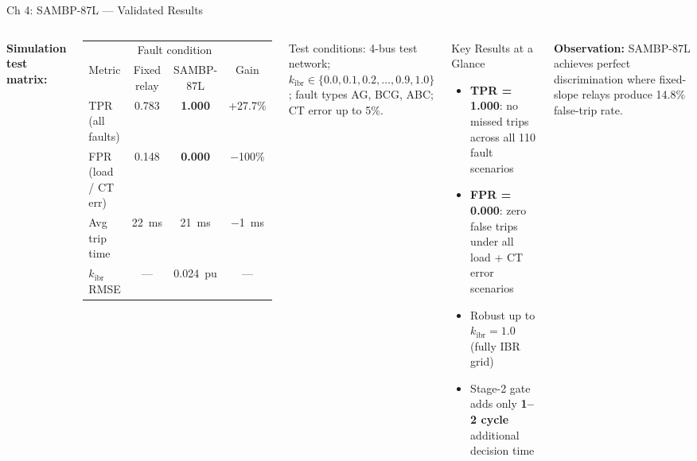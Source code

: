 \documentclass[10pt,aspectratio=169]{beamer}
\newcommand{\obs}[1]{%
  {\color{iitmred}\textbf{Observation:} #1}%
}
\newcommand{\kibr}{k_{\mathrm{ibr}}}
\begin{document}
\begin{frame}{Ch 4: SAMBP-87L — Validated Results}
  \begin{columns}[T]
      \textbf{Simulation test matrix:}
      \begin{center}\small
        \begin{tabular}{lccc}
          \toprule
          & \multicolumn{2}{c}{Fault condition} & \\
          \cmidrule(lr){2-3}
          Metric & Fixed relay & SAMBP-87L & Gain \\
          \midrule
          TPR (all faults) & 0.783 & \textbf{1.000} & +27.7\% \\
          FPR (load / CT err) & 0.148 & \textbf{0.000} & $-$100\% \\
          Avg trip time & 22~ms & 21~ms & $-$1~ms \\
          $\kibr$ RMSE & — & 0.024~pu & — \\
          \bottomrule
        \end{tabular}
      \end{center}
      \vspace{0.2cm}
      \small Test conditions: 4-bus test network;
      $\kibr \in \{0.0, 0.1, 0.2, \ldots, 0.9, 1.0\}$;
      fault types AG, BCG, ABC; CT error up to 5\%.
      \begin{block}{\small Key Results at a Glance}
        \small
        \begin{itemize}\itemsep4pt
          \item \textbf{TPR = 1.000}: no missed trips across
            all 110 fault scenarios
          \item \textbf{FPR = 0.000}: zero false trips under
            all load + CT error scenarios
          \item Robust up to \textbf{$\kibr = 1.0$}
            (fully IBR grid)
          \item Stage-2 gate adds only \textbf{1–2 cycle}
            additional decision time
        \end{itemize}
      \end{block}
      \vspace{0.2cm}
      \obs{SAMBP-87L achieves perfect discrimination
        where fixed-slope relays produce 14.8\% false-trip rate.}
  \end{columns}
\end{frame}
\end{document}

